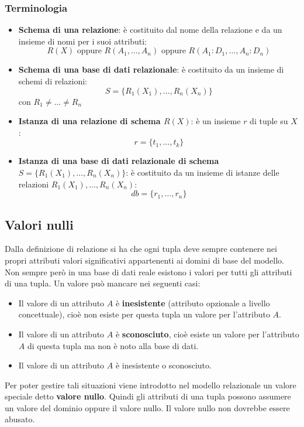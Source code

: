 \documentclass[a4paper,twoside]{article}
\begin{document}
\subsubsection{Terminologia}
\begin{itemize}
  \item \textbf{Schema di una relazione}: è costituito dal nome della relazione e
    da un insieme di nomi per i suoi attributi:
    \[
      R(X) \text{ oppure } R(A_1, \ldots, A_n) \text{ oppure } R(A_1: D_1, \ldots, A_n: D_n)
    \] 

  \item \textbf{Schema di una base di dati relazionale}: è costituito da un insieme di
    schemi di relazioni:
    \[
      S = \{ R_1(X_1), \ldots, R_n(X_n) \}
    \]
    con \( R_1 \neq \ldots \neq R_n \) 

  \item \textbf{Istanza di una relazione di schema \( R(X) \)}: è un insieme \( r \) 
    di tuple su \( X \):
    \[
      r = \{ t_1, \ldots, t_k \}
    \]

  \item \textbf{Istanza di una base di dati relazionale di schema\\ \( S = \{ R_1(X_1), \ldots, R_n(X_n) \} \)}:
    è costituito da un insieme di istanze delle relazioni \( R_1(X_1), \ldots, R_n(X_n) \):
    \[
      db = \{ r_1, \ldots, r_n \}
    \] 
\end{itemize}

\subsection{Valori nulli}
Dalla definizione di relazione si ha che ogni tupla deve sempre contenere nei propri
attributi valori significativi appartenenti ai domini di base del modello. Non sempre
però in una base di dati reale esistono i valori per tutti gli attributi di una tupla.
Un valore può mancare nei seguenti casi:
\begin{itemize}
  \item Il valore di un attributo \( A \) è \textbf{inesistente} (attributo opzionale
    a livello concettuale), cioè non esiste per questa tupla un valore per l'attributo
    \( A \).

  \item Il valore di un attributo \( A \) è \textbf{sconosciuto}, cioè esiste un valore
    per l'attributo \( A \) di questa tupla ma non è noto alla base di dati.

  \item Il valore di un attributo \( A \) è inesistente o sconosciuto.
\end{itemize}
Per poter gestire tali situazioni viene introdotto nel modello relazionale un valore
speciale detto \textbf{valore nullo}. Quindi gli attributi di una tupla possono assumere
un valore del dominio oppure il valore nullo. Il valore nullo non dovrebbe essere abusato.
\end{document}
